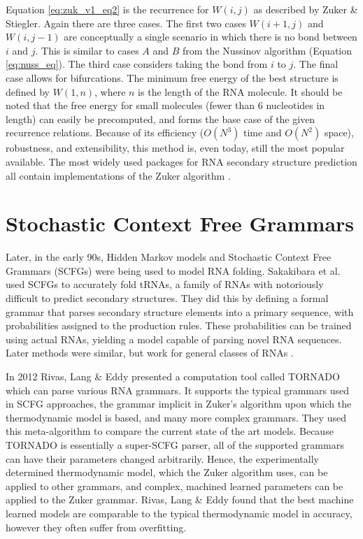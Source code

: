 \documentclass[12pt, a4paper]{article}
\begin{document}
Equation \ref{eq:zuk_v1_eq2} is the recurrence for $W(i, j)$ as described by Zuker \& Stiegler.
Again there are three cases. The first two cases $W (i + 1, j)$ and $W(i, j - 1)$ are conceptually a single scenario in which there is no bond between $i$ and $j$. This is similar to cases $A$ and $B$ from the Nussinov algorithm (Equation \ref{eq:nuss_eq}). The third case considers taking the bond from
$i$ to $j$. The final case allows for bifurcations. The minimum free energy of the best structure is defined by $W(1, n)$, where $n$ is the length of the RNA molecule. It should
be noted that the free energy for small molecules (fewer than 6 nucleotides in length) can easily be
precomputed, and forms the base case of the given recurrence relations. Because of
its efficiency ($O(N^3)$ time and $O(N^2)$ space), robustness, and extensibility, this method is,
even today, still the most popular available. The most widely used packages for RNA secondary structure prediction all contain implementations of the Zuker algorithm \cite{lorenz2011viennarna, reuter2010rnastructure}.


\section{Stochastic Context Free Grammars}

Later, in the early 90s, Hidden Markov models and Stochastic Context Free Grammars (SCFGs) were being used to model RNA folding. Sakakibara et al. \cite{sakakibara1994stochastic} used SCFGs to accurately fold tRNAs, a family of RNAs with notoriously difficult to predict secondary structures. They did this by defining a formal grammar that parses secondary structure elements into a primary sequence, with probabilities assigned to the production rules. These probabilities can be trained using actual RNAs, yielding a model capable of parsing novel RNA sequences. Later methods were similar, but work for general classes of RNAs \cite{dowell2004evaluation, knudsen2003pfold}.

In 2012 Rivas, Lang \& Eddy \cite{rivas2012range} presented a computation tool called TORNADO which can parse various RNA grammars. It supports the typical grammars used in SCFG approaches, the grammar implicit in Zuker's algorithm upon which the thermodynamic model is based, and many more complex grammars. They used this meta-algorithm to compare the current state of the art models. Because TORNADO is essentially a super-SCFG parser, all of the supported grammars can have their parameters changed arbitrarily. Hence, the experimentally determined thermodynamic model, which the Zuker algorithm uses, can be applied to other grammars, and complex, machined learned parameters can be applied to the Zuker grammar. Rivas, Lang \& Eddy found that the best machine learned models are comparable to the typical thermodynamic model in accuracy, however they often suffer from overfitting.
\end{document}

